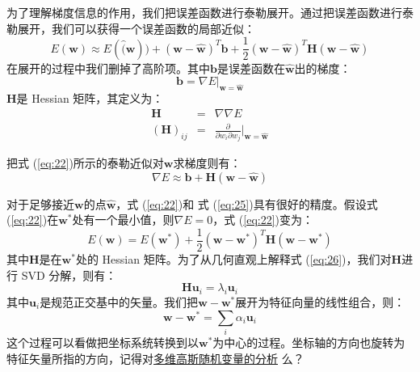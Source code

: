 \documentclass[10pt,a4paper,UTF8]{article}
\begin{document}
为了理解梯度信息的作用，我们把误差函数进行泰勒展开。通过把误差函数进行泰勒展开，我们可以获得一个误差函数的局部近似：
\begin{equation}
\label{eq:22}
E(\mathbf{w}) \approx E(\hat(\mathbf{w})) + (\mathbf{w} - \hat{\mathbf{w}})^{T}\mathbf{b} + \frac{1}{2}(\mathbf{w} - \hat{\mathbf{w}})^{T} \mathbf{H} (\mathbf{w} - \hat{\mathbf{w}})
\end{equation}
在展开的过程中我们删掉了高阶项。其中\(\mathbf{b}\)是误差函数在\(\hat{\mathbf{w}}\)出的梯度：
\begin{equation}
\label{eq:23}
\mathbf{b} = \nabla E|_{\mathbf{w} = \hat{\mathbf{w}}}
\end{equation}
\(\mathbf{H}\)是 Hessian 矩阵，其定义为：
\begin{eqnarray}
\label{eq:24}
\mathbf{H}&=& \nabla \nabla E \\
(\mathbf{H})_{ij} &=& \frac{\partial}{\partial w_{i}\partial w_{j}} \bigg|_{\mathbf{w} = \hat{\mathbf{w}}}
\end{eqnarray}

把式 (\ref{eq:22})所示的泰勒近似对\(\mathbf{w}\)求梯度则有：
\begin{equation}
\label{eq:25}
\nabla E \approx \mathbf{b} + \mathbf{H} (\mathbf{w} - \hat{\mathbf{w}})
\end{equation}

对于足够接近\(\mathbf{w}\)的点\(\hat{\mathbf{w}}\)，式 (\ref{eq:22})和 式 (\ref{eq:25})具有很好的精度。假设式 (\ref{eq:22})在\(\mathbf{w}^{*}\)处有一个最小值，则\(\nabla E = 0\)，式 (\ref{eq:22})变为：
\begin{equation}
\label{eq:26}
E(\mathbf{w}) = E(\mathbf{w}^{*}) + \frac{1}{2} (\mathbf{w} - \mathbf{w}^{*})^{T} \mathbf{H} (\mathbf{w} - {\mathbf{w}^{*}})
\end{equation}
其中\(\mathbf{H}\)是在\(\mathbf{w}^{*}\)处的 Hessian 矩阵。为了从几何直观上解释式 (\ref{eq:26})，我们对\(\mathbf{H}\)进行 SVD 分解，则有：
\begin{equation}
\label{eq:27}
\mathbf{H}\mathbf{u}_{i} = \lambda_{i}\mathbf{u}_{i}
\end{equation}
其中\(\mathbf{u}_{i}\)是规范正交基中的矢量。我们把\(\mathbf{w} - \mathbf{w}^{*}\)展开为特征向量的线性组合，则：
\begin{equation}
\label{eq:28}
\mathbf{w} - \mathbf{w}^{*} = \sum_{i}\alpha_{i}\mathbf{u}_{i}
\end{equation}
这个过程可以看做把坐标系统转换到以\(\mathbf{w}^{*}\)为中心的过程。坐标轴的方向也旋转为特征矢量所指的方向，记得对\href{PRMLch2dot3-gaussian-again.org}{多维高斯随机变量的分析} 么？
\end{document}
